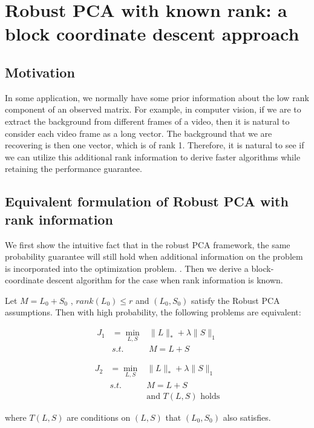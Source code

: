 \newpage
\section{Robust PCA with known rank: a block coordinate descent approach}

\subsection{Motivation}
In some application, we normally have some prior information about the low rank component of an observed matrix. For example, in computer vision, if we are to extract the background from different frames of a video, then it is natural to consider each video frame as a long vector. The background that we are recovering is then one vector, which is of rank 1. Therefore, it is natural to see if we can utilize this additional rank information to derive faster algorithms while retaining the performance guarantee.



\subsection{Equivalent formulation of Robust PCA with rank information}

We first show the intuitive fact that in the robust PCA framework, the same probability
guarantee will still hold when additional information on the problem is incorporated into the optimization problem. . Then we
derive a block-coordinate descent algorithm for the case when rank
information is known.
\begin{prop}
\label{prop:restriction prob}Let $M=L_{0}+S_{0}$ , $rank(L_{0})\le r$ and $(L_0,S_0)$
satisfy the Robust PCA assumptions. Then with high probability, the
following problems are equivalent:

\begin{eqnarray}
J_{1} & =\min_{L,S} & \|L\|_{*}+\lambda\|S\|_{1}\label{eq:general}\\
 & s.t. & M=L+S\nonumber
\end{eqnarray}

\begin{eqnarray}
J_{2} & =\min_{L,S} & \|L\|_{*}+\lambda\|S\|_{1}\label{eq:restricted}\\
 & s.t. & M=L+S\nonumber \\
 &  & \text{and }T(L,S)\text{ holds}\nonumber
\end{eqnarray}


where $T(L,S)$ are conditions on $(L,S)$ that $(L_{0},S_{0})$ also
satisfies.
\end{prop}

